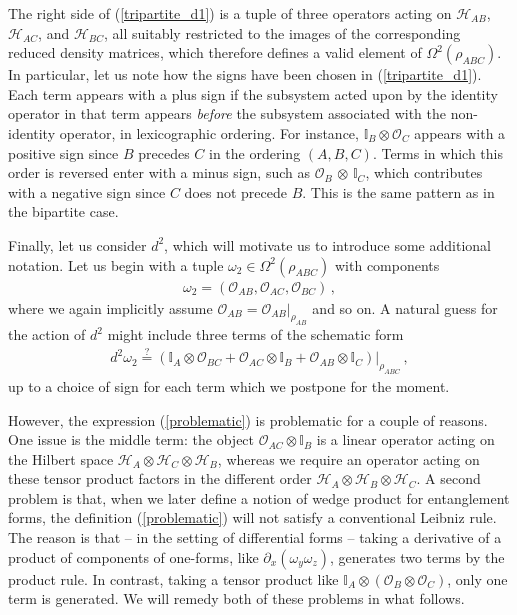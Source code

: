 \documentclass[12pt]{article}
\numberwithin{equation}{section}
\begin{document}
%
The right side of (\ref{tripartite_d1}) is a tuple of three operators acting on $\mathcal{H}_{AB}$, $\mathcal{H}_{AC}$, and $\mathcal{H}_{BC}$, all suitably restricted to the images of the corresponding reduced density matrices, which therefore defines a valid element of $\Omega^2 ( \rho_{ABC} )$. In particular, let us note how the signs have been chosen in (\ref{tripartite_d1}). Each term appears with a plus sign if the subsystem acted upon by the identity operator in that term appears \emph{before} the subsystem associated with the non-identity operator, in lexicographic ordering. For instance, $\mathbb{I}_B \otimes \mathcal{O}_C$ appears with a positive sign since $B$ precedes $C$ in the ordering $(A, B, C)$. Terms in which this order is reversed enter with a minus sign, such as $\mathcal{O}_B \, \otimes \, \mathbb{I}_C$, which contributes with a negative sign since $C$ does not precede $B$. This is the same pattern as in the bipartite case.


Finally, let us consider $d^2$, which will motivate us to introduce some additional notation. Let us begin with a tuple $\omega_2 \in \Omega^2 \left( \rho_{ABC} \right)$ with components
%
\begin{align}
    \omega_2 = \left( \mathcal{O}_{AB} , \mathcal{O}_{AC} , \mathcal{O}_{BC} \right) \, ,
\end{align}
%
where we again implicitly assume $\mathcal{O}_{AB} = \mathcal{O}_{AB} \big\vert_{\rho_{AB}}$ and so on. A natural guess for the action of $d^2$ might include three terms of the schematic form
%
\begin{align}\label{problematic}
    d^2 \omega_2 \overset{?}{=} \left( \mathbb{I}_A \otimes \mathcal{O}_{BC} + \mathcal{O}_{AC} \otimes \mathbb{I}_B + \mathcal{O}_{AB} \otimes \mathbb{I}_C \right) \big\vert_{\rho_{ABC}} \, ,
\end{align}
%
up to a choice of sign for each term which we postpone for the moment.

However, the expression (\ref{problematic}) is problematic for a couple of reasons. One issue is the middle term: the object $\mathcal{O}_{AC} \otimes \mathbb{I}_B$ is a linear operator acting on the Hilbert space $\mathcal{H}_A \otimes \mathcal{H}_C \otimes \mathcal{H}_B$, whereas we require an operator acting on these tensor product factors in the different order $\mathcal{H}_A \otimes \mathcal{H}_B \otimes \mathcal{H}_C$. A second problem is that, when we later define a notion of wedge product for entanglement forms, the definition (\ref{problematic}) will not satisfy a conventional Leibniz rule. The reason is that -- in the setting of differential forms -- taking a derivative of a product of components of one-forms, like $\partial_x \left( \omega_y \omega_z \right)$, generates two terms by the product rule. In contrast, taking a tensor product like $\mathbb{I}_A \otimes \left( \mathcal{O}_B \otimes \mathcal{O}_C \right)$, only one term is generated. We will remedy both of these problems in what follows.
\end{document}
